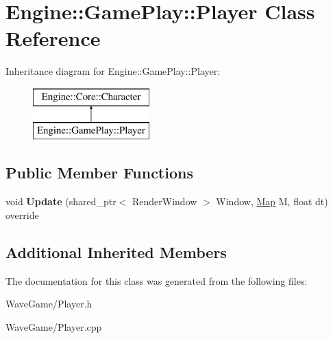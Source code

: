 \hypertarget{class_engine_1_1_game_play_1_1_player}{}\section{Engine\+:\+:Game\+Play\+:\+:Player Class Reference}
\label{class_engine_1_1_game_play_1_1_player}
Inheritance diagram for Engine\+:\+:Game\+Play\+:\+:Player\+:\begin{figure}[H]
\begin{center}
\leavevmode
\includegraphics[height=2.000000cm]{class_engine_1_1_game_play_1_1_player}
\end{center}
\end{figure}
\subsection*{Public Member Functions}
\begin{DoxyCompactItemize}
\item 
\mbox{\label{class_engine_1_1_game_play_1_1_player_a86f6dba52b8f855d5bcedf061a04017d}} 
void {\bfseries Update} (shared\+\_\+ptr$<$ Render\+Window $>$ Window, \hyperlink{class_engine_1_1_core_1_1_map}{Map} M, float dt) override
\end{DoxyCompactItemize}
\subsection*{Additional Inherited Members}


The documentation for this class was generated from the following files\+:\begin{DoxyCompactItemize}
\item 
Wave\+Game/Player.\+h\item 
Wave\+Game/Player.\+cpp\end{DoxyCompactItemize}
